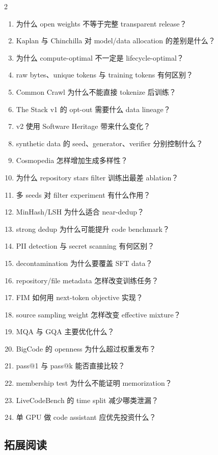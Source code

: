 \documentclass[a4paper]{article}
\begin{document}
\begin{multicols}{2}
\footnotesize
\begin{enumerate}
  \setlength{\itemsep}{0pt}
  \item 为什么 open weights 不等于完整 transparent release？
  \item Kaplan 与 Chinchilla 对 model/data allocation 的差别是什么？
  \item 为什么 compute-optimal 不一定是 lifecycle-optimal？
  \item raw bytes、unique tokens 与 training tokens 有何区别？
  \item Common Crawl 为什么不能直接 tokenize 后训练？
  \item The Stack v1 的 opt-out 需要什么 data lineage？
  \item v2 使用 Software Heritage 带来什么变化？
  \item synthetic data 的 seed、generator、verifier 分别控制什么？
  \item Cosmopedia 怎样增加生成多样性？
  \item 为什么 repository stars filter 训练出最差 ablation？
  \item 多 seeds 对 filter experiment 有什么作用？
  \item MinHash/LSH 为什么适合 near-dedup？
  \item strong dedup 为什么可能提升 code benchmark？
  \item PII detection 与 secret scanning 有何区别？
  \item decontamination 为什么要覆盖 SFT data？
  \item repository/file metadata 怎样改变训练任务？
  \item FIM 如何用 next-token objective 实现？
  \item source sampling weight 怎样改变 effective mixture？
  \item MQA 与 GQA 主要优化什么？
  \item BigCode 的 openness 为什么超过权重发布？
  \item pass@1 与 pass@k 能否直接比较？
  \item membership test 为什么不能证明 memorization？
  \item LiveCodeBench 的 time split 减少哪类泄漏？
  \item 单 GPU 做 code assistant 应优先投资什么？
\end{enumerate}
\end{multicols}

\subsection{拓展阅读}
\end{document}
